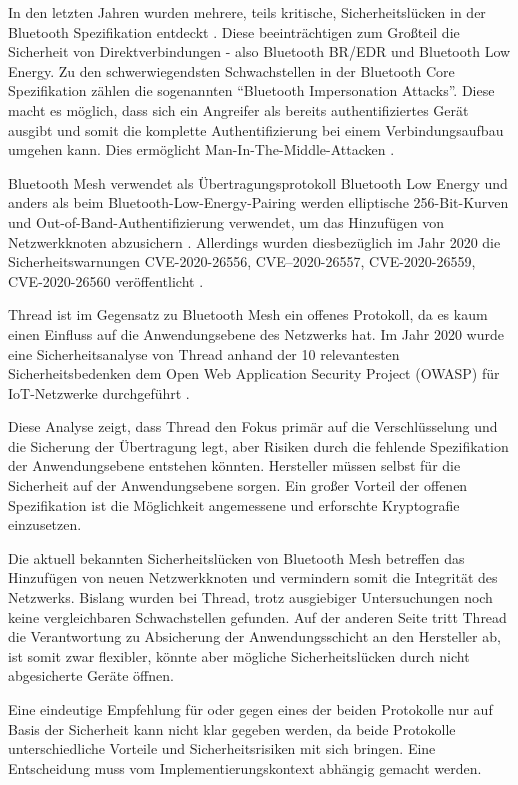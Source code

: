 \documentclass{article}
\begin{document}
In den letzten Jahren wurden mehrere, teils kritische, Sicherheitslücken in der
Bluetooth Spezifikation entdeckt \parencite{BluetoothIssues}. Diese
beeinträchtigen zum Großteil die Sicherheit von Direktverbindungen - also
Bluetooth BR/EDR und Bluetooth Low Energy. Zu den schwerwiegendsten
Schwachstellen in der Bluetooth Core Spezifikation zählen die sogenannten
``Bluetooth Impersonation Attacks''. Diese macht es möglich, dass sich ein
Angreifer als bereits authentifiziertes Gerät ausgibt und somit die komplette
Authentifizierung bei einem Verbindungsaufbau umgehen kann. Dies ermöglicht
Man-In-The-Middle-Attacken \parencite{BluetoothLowEnergyAttackOxford}.

Bluetooth Mesh verwendet als Übertragungsprotokoll Bluetooth Low Energy und
anders als beim Bluetooth-Low-Energy-Pairing werden elliptische 256-Bit-Kurven
und Out-of-Band-Authentifizierung verwendet, um das Hinzufügen von
Netzwerkknoten abzusichern \parencite{BluetoothSpec}. Allerdings wurden
diesbezüglich im Jahr 2020 die Sicherheitswarnungen CVE-2020-26556,
CVE–2020-26557, CVE-2020-26559, CVE-2020-26560 veröffentlicht
\parencite{BluetoothIssues}.

Thread ist im Gegensatz zu Bluetooth Mesh ein offenes Protokoll, da es kaum
einen Einfluss auf die Anwendungsebene des Netzwerks hat. Im Jahr 2020 wurde
eine Sicherheitsanalyse von Thread anhand der 10 relevantesten
Sicherheitsbedenken dem Open Web Application Security Project (OWASP) für
IoT-Netzwerke durchgeführt \parencite{ThreadSecurityCSIAC}.

Diese Analyse zeigt, dass Thread den Fokus primär auf die Verschlüsselung und
die Sicherung der Übertragung legt, aber Risiken durch die fehlende
Spezifikation der Anwendungsebene entstehen könnten. Hersteller müssen selbst
für die Sicherheit auf der Anwendungsebene sorgen. Ein großer Vorteil der
offenen Spezifikation ist die Möglichkeit angemessene und erforschte
Kryptografie einzusetzen.

Die aktuell bekannten Sicherheitslücken von Bluetooth Mesh betreffen das
Hinzufügen von neuen Netzwerkknoten \parencite{BluetoothIssues} und vermindern
somit die Integrität des Netzwerks. Bislang wurden bei Thread, trotz ausgiebiger
Untersuchungen \parencite{ThreadSecurityCSIAC, ThreadSecurityEmbeddedCom}
noch keine vergleichbaren Schwachstellen gefunden. Auf der anderen Seite tritt
Thread die Verantwortung zu Absicherung der Anwendungsschicht an den Hersteller
ab, ist somit zwar flexibler, könnte aber mögliche Sicherheitslücken durch
nicht abgesicherte Geräte öffnen.

Eine eindeutige Empfehlung für oder gegen eines der beiden Protokolle nur auf
Basis der Sicherheit kann nicht klar gegeben werden, da beide Protokolle
unterschiedliche Vorteile und Sicherheitsrisiken mit sich bringen. Eine
Entscheidung muss vom Implementierungskontext abhängig gemacht werden.

\restoregeometry

\printbibliography[heading=none]
\end{document}
